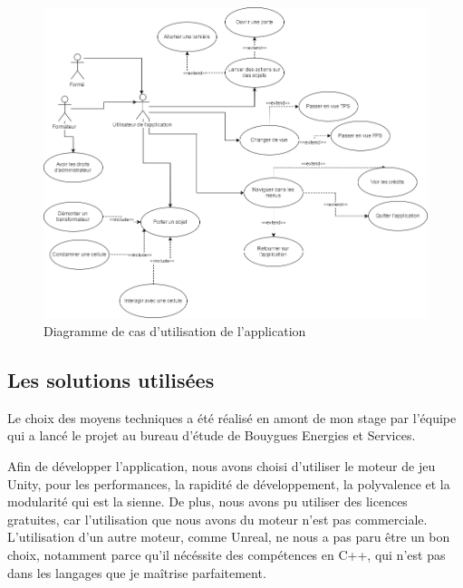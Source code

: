 \documentclass[a4paper]{article}
\begin{document}
    \vfill 
    \begin{figure}[H]
        \centering
        \includegraphics[scale=0.5]{img/UseCases}
        \caption{Diagramme de cas d'utilisation de l'application}
    \end{figure}
    \vfill

    \newpage

    \subsection{Les solutions utilisées}

    Le choix des moyens techniques a été réalisé en amont de mon stage par l'équipe qui a lancé le projet au bureau d'étude de Bouygues Energies et Services. \\ 

    \vfill

    Afin de développer l'application, nous avons choisi d'utiliser le moteur de jeu Unity, pour les performances, la rapidité de développement, la polyvalence et la modularité qui est la sienne. De plus, nous avons pu utiliser des licences gratuites, car l'utilisation que nous avons du moteur n'est pas commerciale. L'utilisation d'un autre moteur, comme Unreal, ne nous a pas paru être un bon choix, notamment parce qu'il nécéssite des compétences en C++, qui n'est pas dans les langages que je maîtrise parfaitement. \\
\end{document}
